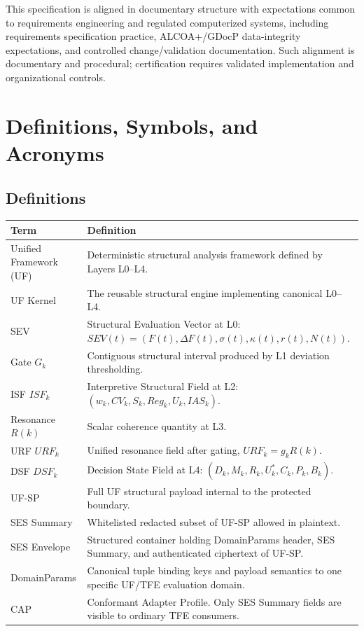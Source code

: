 \documentclass[11pt]{report}
\begin{document}
This specification is aligned in documentary structure with expectations common to requirements engineering and regulated computerized systems, including requirements specification practice, ALCOA+/GDocP data-integrity expectations, and controlled change/validation documentation. Such alignment is documentary and procedural; certification requires validated implementation and organizational controls.

\chapter{Definitions, Symbols, and Acronyms}
\section{Definitions}
\begin{longtable}{p{}p{}}
\toprule
Term & Definition \\
\midrule
Unified Framework (UF) & Deterministic structural analysis framework defined by Layers L0--L4. \\
UF Kernel & The reusable structural engine implementing canonical L0--L4. \\
SEV & Structural Evaluation Vector at L0: $SEV(t)=(F(t),\Delta F(t),\sigma(t),\kappa(t),r(t),N(t))$. \\
Gate $G_k$ & Contiguous structural interval produced by L1 deviation thresholding. \\
ISF $ISF_k$ & Interpretive Structural Field at L2: $(w_k,CV_k,S_k,Reg_k,U_k,IAS_k)$. \\
Resonance $R(k)$ & Scalar coherence quantity at L3. \\
URF $URF_k$ & Unified resonance field after gating, $URF_k=g_kR(k)$. \\
DSF $DSF_k$ & Decision State Field at L4: $(D_k,M_k,R_k,U_k^{\ast},C_k,P_k,B_k)$. \\
UF-SP & Full UF structural payload internal to the protected boundary. \\
SES Summary & Whitelisted redacted subset of UF-SP allowed in plaintext. \\
SES Envelope & Structured container holding DomainParams header, SES Summary, and authenticated ciphertext of UF-SP. \\
DomainParams & Canonical tuple binding keys and payload semantics to one specific UF/TFE evaluation domain. \\
CAP & Conformant Adapter Profile. Only SES Summary fields are visible to ordinary TFE consumers. \\

\end{longtable}
\end{document}
